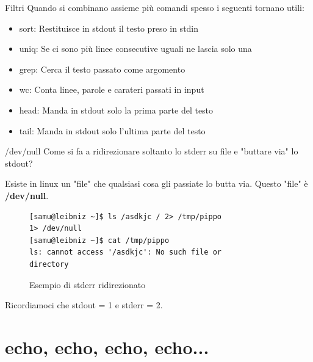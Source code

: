 \documentclass{beamer}
\begin{document}
\begin{frame}{Filtri}
  Quando si combinano assieme più comandi spesso i seguenti tornano utili:
  \begin{itemize}
    \item<1-> sort: Restituisce in stdout il testo preso in stdin
    \item<2-> uniq: Se ci sono più linee consecutive uguali ne lascia solo una
    \item<3-> grep: Cerca il testo passato come argomento
    \item<4-> wc: Conta linee, parole e carateri passati in input
    \item<5-> head: Manda in stdout solo la prima parte del testo
    \item<6-> tail: Manda in stdout solo l'ultima parte del testo
  \end{itemize}
\end{frame}

\begin{frame}[fragile]{/dev/null}
  Come si fa a ridirezionare soltanto lo stderr su file e "buttare via" lo
  stdout? \medskip
  \pause

  Esiste in linux un "file" che qualsiasi cosa gli passiate lo butta via. Questo
  "file" è \textbf{/dev/null}.\medskip

  \begin{figure}
    \begin{lstlisting}
[samu@leibniz ~]$ ls /asdkjc / 2> /tmp/pippo 
1> /dev/null
[samu@leibniz ~]$ cat /tmp/pippo
ls: cannot access '/asdkjc': No such file or 
directory
    \end{lstlisting}
    \caption{Esempio di stderr ridirezionato}
  \end{figure}

Ricordiamoci che stdout = 1 e stderr = 2.
\end{frame}

\section{\Large echo, \small echo, \tiny echo, echo...}
\end{document}
